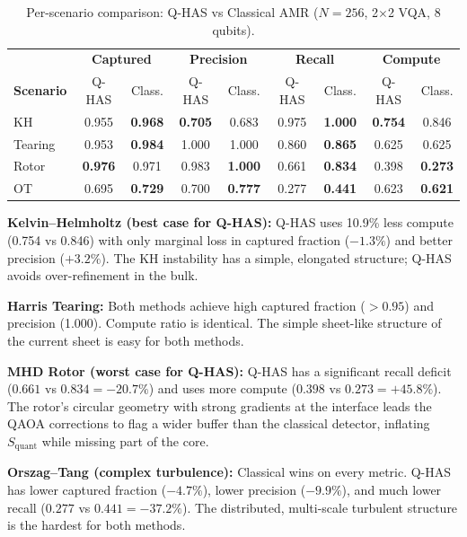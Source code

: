 \documentclass[12pt, a4paper, oneside]{report}
\begin{document}
\begin{table}[H]
\centering
\caption{Per-scenario comparison: Q-HAS vs Classical AMR ($N = 256$, 2$\times$2 VQA, 8 qubits).}
\label{tab:per-scenario}
\begin{tabular}{lcccccccc}
\toprule
 & \multicolumn{2}{c}{\textbf{Captured}} & \multicolumn{2}{c}{\textbf{Precision}} & \multicolumn{2}{c}{\textbf{Recall}} & \multicolumn{2}{c}{\textbf{Compute}} \\
\textbf{Scenario} & Q-HAS & Class. & Q-HAS & Class. & Q-HAS & Class. & Q-HAS & Class. \\
\midrule
KH      & 0.955 & \textbf{0.968} & \textbf{0.705} & 0.683 & 0.975 & \textbf{1.000} & \textbf{0.754} & 0.846 \\
Tearing & 0.953 & \textbf{0.984} & 1.000 & 1.000 & 0.860 & \textbf{0.865} & 0.625 & 0.625 \\
Rotor   & \textbf{0.976} & 0.971 & 0.983 & \textbf{1.000} & 0.661 & \textbf{0.834} & 0.398 & \textbf{0.273} \\
OT      & 0.695 & \textbf{0.729} & 0.700 & \textbf{0.777} & 0.277 & \textbf{0.441} & 0.623 & \textbf{0.621} \\
\bottomrule
\end{tabular}
\end{table}

\textbf{Kelvin--Helmholtz (best case for Q-HAS):} Q-HAS uses 10.9\% less compute (0.754 vs 0.846) with only marginal loss in captured fraction ($-1.3\%$) and better precision ($+3.2\%$). The KH instability has a simple, elongated structure; Q-HAS avoids over-refinement in the bulk.

\textbf{Harris Tearing:} Both methods achieve high captured fraction ($>0.95$) and precision (1.000). Compute ratio is identical. The simple sheet-like structure of the current sheet is easy for both methods.

\textbf{MHD Rotor (worst case for Q-HAS):} Q-HAS has a significant recall deficit ($0.661$ vs $0.834 = -20.7\%$) and uses more compute ($0.398$ vs $0.273 = +45.8\%$). The rotor's circular geometry with strong gradients at the interface leads the QAOA corrections to flag a wider buffer than the classical detector, inflating $S_{\text{quant}}$ while missing part of the core.

\textbf{Orszag--Tang (complex turbulence):} Classical wins on every metric. Q-HAS has lower captured fraction ($-4.7\%$), lower precision ($-9.9\%$), and much lower recall ($0.277$ vs $0.441 = -37.2\%$). The distributed, multi-scale turbulent structure is the hardest for both methods.
\end{document}
